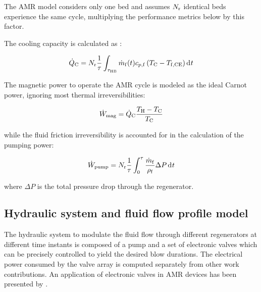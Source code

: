 \documentclass[referee]{svjour3}
\newcommand{\mrate}{\rate{m}}
\begin{document}
The AMR model considers only one bed and assumes $N_{\mathrm{r}}$ identical beds experience the same cycle, multiplying the performance metrics below by this factor.


The cooling capacity is calculated as \cite{bib:trevizoli16_perfor_model}:

\begin{equation}
\label{eq:99}
\qc = N\ped{r}\frac{1}{\tau} \int_{\tau\ped{HB}} \mrate\ped{f}(t) c_{p,\mathrm{f}} \left( T\ped{C} -T\ped{f,CE} \right) \diffd{t}
\end{equation}


\nomenclature[am]{$\mrate\ped{f}$}{mass flow rate [\si{\kg\per\second}]}

The magnetic power to operate the AMR cycle is modeled as the ideal Carnot power, ignoring most thermal irreversibilities:

\begin{equation}
\label{eq:100}
\dot{W}_{\mathrm{mag}} = \dot{Q}_{\mathrm{C}} \frac{T_{\mathrm{H}} - T_{\mathrm{C}}}{T_{\mathrm{C}}}
\end{equation}

\noindent while the fluid friction irreversibility is accounted for in the calculation of the pumping power:

\begin{equation}
\label{eq:103}
\wpump = N\ped{r}\frac{1}{\tau}\int_0^{\tau}\frac{\rate{m}\ped{f}}{\rho\ped{f}} \Delta P \diffd{t}
\end{equation}

\noindent where $\Delta P$ is the total pressure drop through the regenerator.


\subsection{Hydraulic system  and fluid flow profile model}
\label{sec:hydr-syst-model}


The hydraulic system to modulate the fluid flow through different regenerators at different time instants is composed of a pump and a set of electronic valves which can be precisely controlled to yield the desired blow durations. The electrical power consumed by the valve array is computed separately from other work contributions. An application of electronic valves in AMR devices has been presented by \cite{bib:nakashima18-perfor-asses-solen-valves-flow}.
\end{document}
